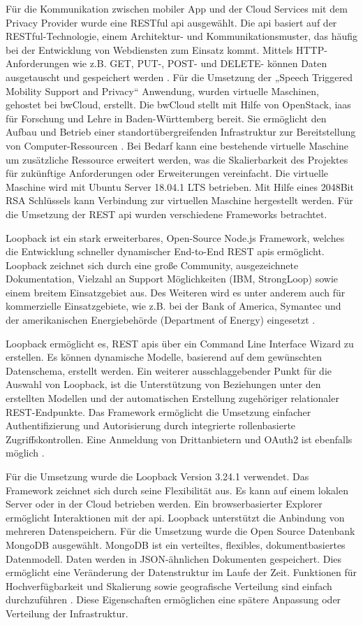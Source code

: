 Für die Kommunikation zwischen mobiler App und der Cloud Services mit dem Privacy Provider wurde eine RESTful \ac{api} ausgewählt. Die \ac{api} basiert auf der RESTful-Technologie, einem Architektur- und Kommunikationsmuster, das häufig bei der Entwicklung von Webdiensten zum Einsatz kommt. Mittels HTTP-Anforderungen wie z.B. GET, PUT-, POST- und DELETE- können Daten ausgetauscht und gespeichert werden \cite{restful-api}. Für die Umsetzung der „Speech Triggered Mobility Support and Privacy“ Anwendung, wurden virtuelle Maschinen, gehostet bei bwCloud, erstellt. Die bwCloud stellt mit Hilfe von OpenStack, \ac{iaas} für Forschung und Lehre in Baden-Württemberg bereit. Sie ermöglicht den Aufbau und Betrieb einer standortübergreifenden Infrastruktur zur Bereitstellung von Computer-Ressourcen \cite{bw-cloud}. Bei Bedarf kann eine bestehende virtuelle Maschine um zusätzliche Ressource erweitert werden, was die Skalierbarkeit des Projektes für zukünftige Anforderungen oder Erweiterungen vereinfacht. Die virtuelle Maschine wird mit Ubuntu Server 18.04.1 LTS betrieben. Mit Hilfe eines 2048Bit RSA Schlüssels kann Verbindung zur virtuellen Maschine hergestellt werden. Für die Umsetzung der REST \ac{api} wurden verschiedene Frameworks betrachtet. 

Loopback ist ein stark erweiterbares, Open-Source Node.js Framework, welches die Entwicklung schneller dynamischer End-to-End REST \ac{api}s ermöglicht. Loopback zeichnet sich durch eine große Community, ausgezeichnete Dokumentation, Vielzahl an Support Möglichkeiten (IBM, StrongLoop) sowie einem breitem Einsatzgebiet aus. Des Weiteren wird es unter anderem auch für kommerzielle Einsatzgebiete, wie z.B. bei der Bank of America, Symantec und der amerikanischen Energiebehörde (Department of Energy) eingesetzt \cite{loopback}.

Loopback ermöglicht es, REST \ac{api}s über ein Command Line Interface Wizard zu erstellen. Es können dynamische Modelle, basierend auf dem gewünschten Datenschema, erstellt werden. Ein weiterer ausschlaggebender Punkt für die Auswahl von Loopback, ist die Unterstützung von Beziehungen unter den erstellten Modellen und der automatischen Erstellung zugehöriger relationaler REST-Endpunkte. Das Framework ermöglicht die Umsetzung einfacher Authentifizierung und Autorisierung durch integrierte rollenbasierte Zugriffskontrollen. Eine Anmeldung von Drittanbietern und OAuth2 ist ebenfalls möglich \cite{mongodb}.

Für die Umsetzung wurde die Loopback Version 3.24.1 verwendet. Das Framework zeichnet sich durch seine Flexibilität aus. Es kann auf einem lokalen Server oder in der Cloud betrieben werden. Ein browserbasierter Explorer ermöglicht Interaktionen mit der \ac{api}. Loopback unterstützt die Anbindung von mehreren Datenspeichern. Für die Umsetzung wurde die Open Source Datenbank MongoDB ausgewählt. MongoDB ist ein verteiltes, flexibles, dokumentbasiertes Datenmodell. Daten werden in JSON-ähnlichen Dokumenten gespeichert. Dies ermöglicht eine Veränderung der Datenstruktur im Laufe der Zeit. Funktionen für Hochverfügbarkeit und Skalierung sowie geografische Verteilung sind einfach durchzuführen \cite{mongodb}. Diese Eigenschaften ermöglichen eine spätere Anpassung oder Verteilung der Infrastruktur.

